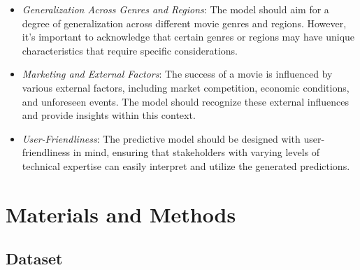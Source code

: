 \documentclass[conference]{IEEEtran}
\begin{document}
\begin{enumerate}
\begin{itemize}
        \item \textit{Generalization Across Genres and Regions}: The model should aim for a degree of generalization across different movie genres and regions. However, it's important to acknowledge that certain genres or regions may have unique characteristics that require specific considerations.

        \item \textit{Marketing and External Factors}: The success of a movie is influenced by various external factors, including market competition, economic conditions, and unforeseen events. The model should recognize these external influences and provide insights within this context.

        \item \textit{User-Friendliness}: The predictive model should be designed with user-friendliness in mind, ensuring that stakeholders with varying levels of technical expertise can easily interpret and utilize the generated predictions.
    \end{itemize}
\end{enumerate}

\section{Materials and Methods}

\subsection{Dataset}
\end{document}
